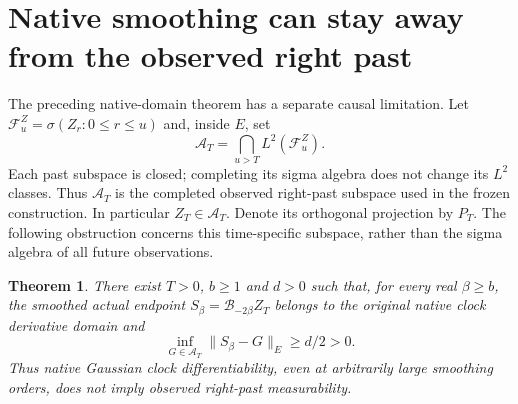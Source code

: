 \documentclass[11pt]{article}
\newtheorem{theorem}{Theorem}[section]
\begin{document}
\section{Native smoothing can stay away from the observed right past}
The preceding native-domain theorem has a separate causal limitation.
Let $\mathcal F_u^Z=\sigma(Z_r:0\leq r\leq u)$ and, inside $E$, set
\[
 \mathcal A_T=\bigcap_{u>T}L^2(\mathcal F_u^Z).
\]
Each past subspace is closed; completing its sigma algebra does not
change its $L^2$ classes. Thus $\mathcal A_T$ is the completed observed
right-past subspace used in the frozen construction. In particular
$Z_T\in\mathcal A_T$. Denote its orthogonal projection by $P_T$.
The following obstruction concerns this time-specific subspace, rather
than the sigma algebra of all future observations.

\begin{theorem}\label{thm:smoothingpast}
There exist $T>0$, $b\geq1$ and $d>0$ such that, for every real
$\beta\geq b$, the smoothed actual endpoint
$S_\beta=\mathcal B_{-2\beta}Z_T$ belongs to the original native clock
derivative domain and
\[
 \inf_{G\in\mathcal A_T}\|S_\beta-G\|_E\geq d/2>0.
\]
Thus native Gaussian clock differentiability, even at arbitrarily large
smoothing orders, does not imply observed right-past measurability.
\end{theorem}
\end{document}
